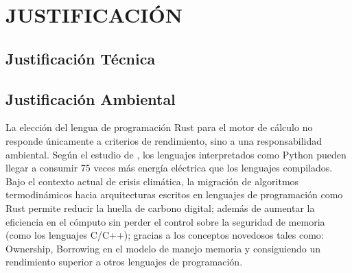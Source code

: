 \section{JUSTIFICACIÓN}
\subsection{Justificación Técnica}
\subsection{Justificación Ambiental}
    La elección del lengua de programación Rust para el motor de cálculo no responde únicamente a criterios de rendimiento, sino a una responsabilidad ambiental. Según el estudio de \parencite{bib:Pereira2017}, los lenguajes interpretados como Python pueden llegar a consumir 75 veces más energía eléctrica que los lenguajes compilados. Bajo el contexto actual de crisis climática, la migración de algoritmos termodinámicos hacia arquitecturas escritos en lenguajes  de programación como Rust permite reducir la huella de carbono digital; además de aumentar la eficiencia en el cómputo sin perder el control sobre la seguridad de memoria (como los lenguajes C/C++); gracias a los conceptos novedosos tales como: Ownership, Borrowing en el modelo de manejo memoria y consiguiendo un rendimiento superior a otros lenguajes de programación.



